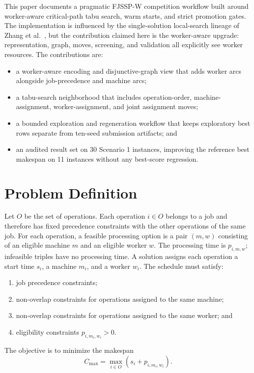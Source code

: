 \documentclass[sigconf,anonymous,review,dvipsnames]{acmart}
\begin{document}
This paper documents a pragmatic FJSSP-W competition workflow built around worker-aware critical-path tabu search, warm starts, and strict promotion gates.
The implementation is influenced by the single-solution local-search lineage of Zhang et al.~\cite{zhang2024awls}, but the contribution claimed here is the worker-aware upgrade: representation, graph, moves, screening, and validation all explicitly see worker resources.
The contributions are:
\begin{itemize}
  \item a worker-aware encoding and disjunctive-graph view that adds worker arcs alongside job-precedence and machine arcs;
  \item a tabu-search neighborhood that includes operation-order, machine-assignment, worker-assignment, and joint assignment moves;
  \item a bounded exploration and regeneration workflow that keeps exploratory best rows separate from ten-seed submission artifacts; and
  \item an audited result set on 30 Scenario 1 instances, improving the reference best makespan on 11 instances without any best-score regression.
\end{itemize}

\section{Problem Definition}
Let $O$ be the set of operations.
Each operation $i \in O$ belongs to a job and therefore has fixed precedence constraints with the other operations of the same job.
For each operation, a feasible processing option is a pair $(m,w)$ consisting of an eligible machine $m$ and an eligible worker $w$.
The processing time is $p_{i,m,w}$; infeasible triples have no processing time.
A solution assigns each operation a start time $s_i$, a machine $m_i$, and a worker $w_i$.
The schedule must satisfy:
\begin{enumerate}
  \item job precedence constraints;
  \item non-overlap constraints for operations assigned to the same machine;
  \item non-overlap constraints for operations assigned to the same worker; and
  \item eligibility constraints $p_{i,m_i,w_i}>0$.
\end{enumerate}
The objective is to minimize the makespan
\[
  C_{\max}=\max_{i\in O}\left(s_i+p_{i,m_i,w_i}\right).
\]
\end{document}
